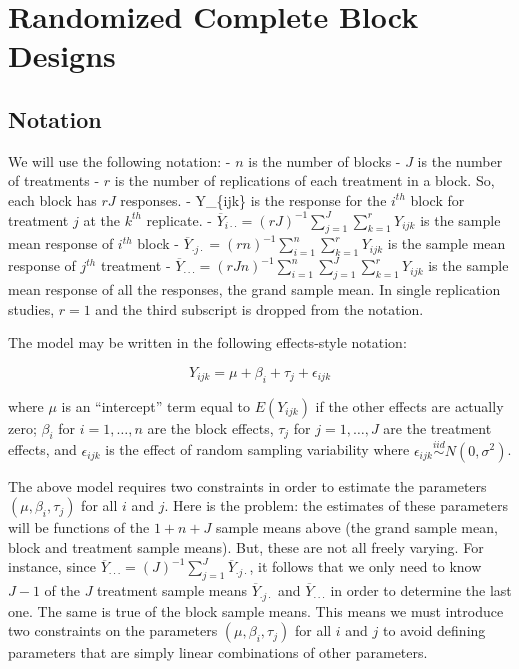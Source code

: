 \documentclass[
]{book}
\begin{document}
\hypertarget{randomized-complete-block-designs}{%
\section{Randomized Complete Block Designs}\label{randomized-complete-block-designs}}

\hypertarget{notation}{%
\subsection{Notation}\label{notation}}

We will use the following notation:
- \(n\) is the number of blocks
- \(J\) is the number of treatments
- \(r\) is the number of replications of each treatment in a block. So, each block has \(rJ\) responses.
- Y\_\{ijk\} is the response for the \(i^{th}\) block for treatment \(j\) at the \(k^{th}\) replicate.
- \(\overline Y_{i\cdot\cdot} = (rJ)^{-1}\sum_{j=1}^J\sum_{k=1}^r Y_{ijk}\) is the sample mean response of \(i^{th}\) block
- \(\overline Y_{\cdot j \cdot} = (rn)^{-1}\sum_{i=1}^n\sum_{k=1}^r Y_{ijk}\) is the sample mean response of \(j^{th}\) treatment
- \(\overline Y_{\cdot\cdot\cdot} = (rJn)^{-1}\sum_{i=1}^n\sum_{j=1}^J\sum_{k=1}^r Y_{ijk}\) is the sample mean response of all the responses, the grand sample mean.
In single replication studies, \(r=1\) and the third subscript is dropped from the notation.

The model may be written in the following effects-style notation:

\[Y_{ijk} = \mu + \beta_i + \tau_j + \epsilon_{ijk}\]

where \(\mu\) is an ``intercept'' term equal to \(E(Y_{ijk})\) if the other effects are actually zero; \(\beta_i\) for \(i=1, \ldots, n\) are the block effects, \(\tau_j\) for \(j = 1, \ldots, J\) are the treatment effects, and \(\epsilon_{ijk}\) is the effect of random sampling variability where \(\epsilon_{ijk}\stackrel{iid}{\sim}N(0,\sigma^2)\).

The above model requires two constraints in order to estimate the parameters \((\mu, \beta_i, \tau_j)\) for all \(i\) and \(j\). Here is the problem: the estimates of these parameters will be functions of the \(1 + n + J\) sample means above (the grand sample mean, block and treatment sample means). But, these are not all freely varying. For instance, since \(\overline Y_{\cdot\cdot\cdot} = (J)^{-1}\sum_{j=1}^J \overline Y_{\cdot j \cdot}\), it follows that we only need to know \(J-1\) of the \(J\) treatment sample means \(\overline Y_{\cdot j \cdot}\) and \(\overline Y_{\cdot\cdot\cdot}\) in order to determine the last one. The same is true of the block sample means. This means we must introduce two constraints on the parameters \((\mu, \beta_i, \tau_j)\) for all \(i\) and \(j\) to avoid defining parameters that are simply linear combinations of other parameters.
\end{document}

